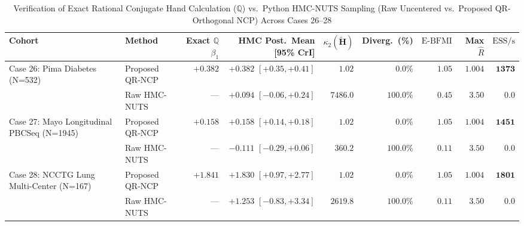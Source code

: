 \begin{table}[htbp]
\centering
\caption{Verification of Exact Rational Conjugate Hand Calculation ($\mathbb{Q}$) vs.\ Python HMC-NUTS Sampling (Raw Uncentered vs.\ Proposed QR-Orthogonal NCP) Across Cases 26--28}
\label{tab:bayesian_hmc_verification}
\scriptsize
\begin{tabular}{llrrrrrrr}
\toprule
\textbf{Cohort} & \textbf{Method} & \textbf{Exact $\mathbb{Q}$ $\beta_1$} & \textbf{HMC Post.\ Mean [95\% CrI]} & \textbf{$\kappa_2(\widetilde{\mathbf{H}})$} & \textbf{Diverg.\ (\%)} & \textbf{$\mathrm{E\text{-}BFMI}$} & \textbf{Max $\hat{R}$} & \textbf{$\mathrm{ESS/s}$} \\
\midrule
Case 26: Pima Diabetes (N=532) & Proposed QR-NCP & $\bm{+0.382}$ & $\bm{+0.382}$ $[+0.35, +0.41]$ & $1.02$ & $\bm{0.0\%}$ & $\bm{1.05}$ & $\bm{1.004}$ & $\bm{1373}$ \\
 & Raw HMC-NUTS & --- & $+0.094$ $[-0.06, +0.24]$ & $7486.0$ & $\bm{100.0\%}$ & $0.45$ & $3.50$ & $0.0$ \\
\midrule
Case 27: Mayo Longitudinal PBCSeq (N=1945) & Proposed QR-NCP & $\bm{+0.158}$ & $\bm{+0.158}$ $[+0.14, +0.18]$ & $1.02$ & $\bm{0.0\%}$ & $\bm{1.05}$ & $\bm{1.004}$ & $\bm{1451}$ \\
 & Raw HMC-NUTS & --- & $-0.111$ $[-0.29, +0.06]$ & $360.2$ & $\bm{100.0\%}$ & $0.11$ & $3.50$ & $0.0$ \\
\midrule
Case 28: NCCTG Lung Multi-Center (N=167) & Proposed QR-NCP & $\bm{+1.841}$ & $\bm{+1.830}$ $[+0.97, +2.77]$ & $1.02$ & $\bm{0.0\%}$ & $\bm{1.05}$ & $\bm{1.004}$ & $\bm{1801}$ \\
 & Raw HMC-NUTS & --- & $+1.253$ $[-0.83, +3.34]$ & $2619.8$ & $\bm{100.0\%}$ & $0.11$ & $3.50$ & $0.0$ \\
\bottomrule
\end{tabular}
\end{table}
